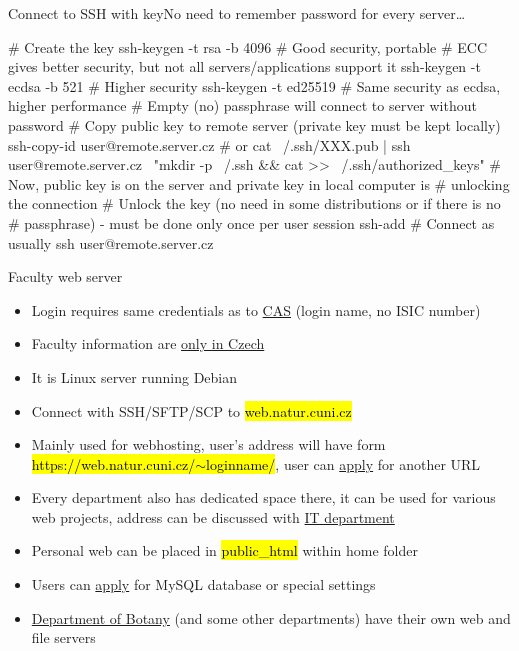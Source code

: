 \documentclass[compress, ucs, xelatex, 11pt, xcolor=svgnames,
  hyperref={
    bookmarks=true,
    unicode=true,
    colorlinks=true,
    pdftitle={Linux, command line and MetaCentrum},
    plainpages=false,
    pdfauthor={Vojtech Zeisek},
    pdfsubject={Course about use of Linux command line, writing shell scripts and using MetaCentrum of CESNET},
    pdfcreator={XeLaTeX},
    pdfkeywords={Linux, GNU, BASH, shell, command line, MetaCentrum},
    linkcolor=DarkRed,
    anchorcolor=DarkBlue,
    citecolor=Indigo,
    filecolor=NavyBlue,
    menucolor=DarkMagenta,
    urlcolor=DarkBlue,
    pdftex},
  url={hyphens, lowtilde} %
  ]{beamer}
\renewcommand{\texttt}[1]{\hl{\ttfamily #1}}
\begin{document}
\begin{frame}[fragile]{Connect to SSH with key}{No need to remember password for every server\ldots}
  \begin{bashcode}
    # Create the key
    ssh-keygen -t rsa -b 4096 # Good security, portable
    # ECC gives better security, but not all servers/applications support it
    ssh-keygen -t ecdsa -b 521 # Higher security
    ssh-keygen -t ed25519 # Same security as ecdsa, higher performance
    # Empty (no) passphrase will connect to server without password
    # Copy public key to remote server (private key must be kept locally)
    ssh-copy-id user@remote.server.cz # or
    cat ~/.ssh/XXX.pub | ssh user@remote.server.cz \
      "mkdir -p ~/.ssh && cat >> ~/.ssh/authorized_keys"
    # Now, public key is on the server and private key in local computer is
    # unlocking the connection
    # Unlock the key (no need in some distributions or if there is no
    # passphrase) - must be done only once per user session
    ssh-add
    # Connect as usually
    ssh user@remote.server.cz
  \end{bashcode}
\end{frame}

\begin{frame}{Faculty web server}
  \begin{itemize}
    \item Login requires same credentials as to \href{https://cas.cuni.cz/}{CAS} (login name, no ISIC number)
    \item Faculty information are \href{https://www.natur.cuni.cz/fakulta/cit/web-aplikace/webhosting}{only in Czech}
    \item It is Linux server running Debian
    \item Connect with SSH/SFTP/SCP to \texttt{web.natur.cuni.cz}
    \item Mainly used for webhosting, user's address will have form \texttt{https://web.natur.cuni.cz/$\sim$loginname/}, user can \href{https://helpdesk.natur.cuni.cz/servlet/HelpdeskDynamic?eid=Rozcestnik}{apply} for another URL
    \item Every department also has dedicated space there, it can be used for various web projects, address can be discussed with \href{https://www.natur.cuni.cz/fakulta/cit/lide}{IT department}
    \item Personal web can be placed in \texttt{public\_html} within home folder
    \item Users can \href{https://helpdesk.natur.cuni.cz/servlet/HelpdeskDynamic?eid=Rozcestnik}{apply} for MySQL database or special settings
    \item \href{https://www.natur.cuni.cz/biology/botany/working-information/servers-webs-computers/}{Department of Botany} (and some other departments) have their own web and file servers
  \end{itemize}
\end{frame}
\end{document}
